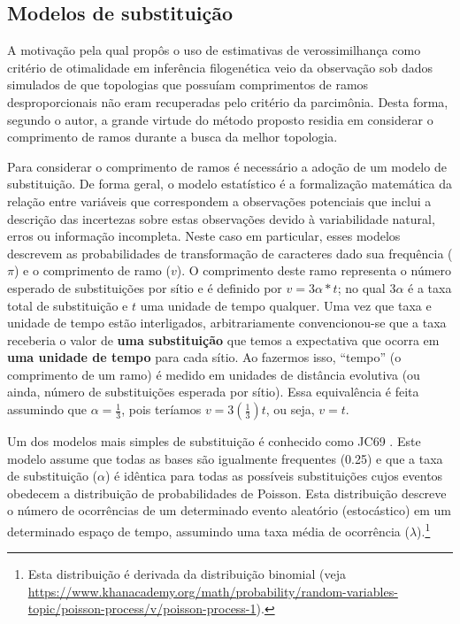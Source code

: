 \begin{refsection}
\section{Modelos de substituição}\label{tut12:mod}

A motivação pela qual \textcite{Felsenstein_1978} propôs o uso de estimativas de verossimilhança como critério de otimalidade em inferência filogenética veio da observação sob dados simulados de que topologias que possuíam comprimentos de ramos desproporcionais não eram recuperadas pelo critério da parcimônia. Desta forma, segundo o autor, a grande virtude do método proposto residia em considerar o comprimento de ramos durante a busca da melhor topologia.

Para considerar o comprimento de ramos é necessário a adoção de um modelo de substituição. De forma geral, o modelo estatístico é a formalização matemática da relação entre variáveis que correspondem a observações potenciais que inclui a descrição das incertezas sobre estas observações devido à variabilidade natural, erros ou informação incompleta. Neste caso em particular, esses modelos descrevem as probabilidades de transformação de caracteres dado sua frequência ($\pi$) e o comprimento de ramo ($v$). O comprimento deste ramo representa o número esperado de substituições por sítio e é definido por $v=3\alpha * t$; no qual $3\alpha$ é a taxa total de substituição e $t$ uma unidade de tempo qualquer. Uma vez que taxa e unidade de tempo estão interligados, arbitrariamente convencionou-se que a taxa receberia o valor de \textbf{uma substituição} que temos a expectativa que ocorra em \textbf{uma unidade de tempo} para cada sítio. Ao fazermos isso, ``tempo'' (o comprimento de um ramo) é medido em unidades de distância evolutiva (ou ainda, número de substituições esperada por sítio). Essa equivalência é feita assumindo que $\alpha = \frac{1}{3}$, pois teríamos $v = 3(\frac{1}{3})t$, ou seja, $v = t$.

Um dos modelos mais simples de substituição é conhecido como JC69 \parencite[][]{Jukes_and_Cantor_1969}. Este modelo assume que todas as bases são igualmente frequentes (0.25) e que a taxa de substituição ($\alpha$) é idêntica para todas as possíveis substituições cujos eventos obedecem a distribuição de probabilidades de Poisson. Esta distribuição descreve o número de ocorrências de um determinado evento aleatório (estocástico) em um determinado espaço de tempo, assumindo uma taxa média de ocorrência ($\lambda$).\footnote{Esta distribuição é derivada da distribuição binomial (veja \url{https://www.khanacademy.org/math/probability/random-variables-topic/poisson-process/v/poisson-process-1}).} 



\end{refsection}

